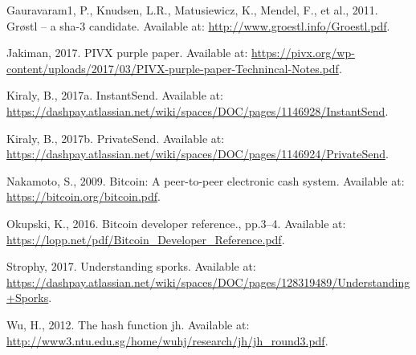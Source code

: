 \documentclass[11pt,a4paperpaper,]{report}
\begin{document}
\hypertarget{ref-Grostl}{}
Gauravaram1, P., Knudsen, L.R., Matusiewicz, K., Mendel, F., et al.,
2011. Grøstl -- a sha-3 candidate. Available at:
\url{http://www.groestl.info/Groestl.pdf}.

\hypertarget{ref-PIVX}{}
Jakiman, 2017. PIVX purple paper. Available at:
\url{https://pivx.org/wp-content/uploads/2017/03/PIVX-purple-paper-Technincal-Notes.pdf}.

\hypertarget{ref-InstantSend}{}
Kiraly, B., 2017a. InstantSend. Available at:
\url{https://dashpay.atlassian.net/wiki/spaces/DOC/pages/1146928/InstantSend}.

\hypertarget{ref-PrivateSend}{}
Kiraly, B., 2017b. PrivateSend. Available at:
\url{https://dashpay.atlassian.net/wiki/spaces/DOC/pages/1146924/PrivateSend}.

\hypertarget{ref-Bitcoin}{}
Nakamoto, S., 2009. Bitcoin: A peer-to-peer electronic cash system.
Available at: \url{https://bitcoin.org/bitcoin.pdf}.

\hypertarget{ref-Bitcoindevreference}{}
Okupski, K., 2016. Bitcoin developer reference., pp.3--4. Available at:
\url{https://lopp.net/pdf/Bitcoin_Developer_Reference.pdf}.

\hypertarget{ref-Sporks}{}
Strophy, 2017. Understanding sporks. Available at:
\url{https://dashpay.atlassian.net/wiki/spaces/DOC/pages/128319489/Understanding+Sporks}.

\hypertarget{ref-JH}{}
Wu, H., 2012. The hash function jh. Available at:
\url{http://www3.ntu.edu.sg/home/wuhj/research/jh/jh_round3.pdf}.
\end{document}
